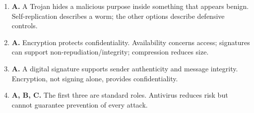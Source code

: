 \begin{enumerate}[label=\textbf{Q\arabic*.}, leftmargin=*]
\item \textbf{A.} A Trojan hides a malicious purpose inside something that appears benign. Self-replication describes a worm; the other options describe defensive controls.

\item \textbf{A.} Encryption protects confidentiality. Availability concerns access; signatures can support non-repudiation/integrity; compression reduces size.

\item \textbf{A.} A digital signature supports sender authenticity and message integrity. Encryption, not signing alone, provides confidentiality.

\item \textbf{A, B, C.} The first three are standard roles. Antivirus reduces risk but cannot guarantee prevention of every attack.

\end{enumerate}
